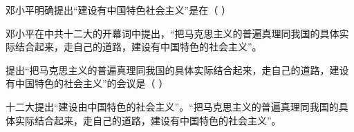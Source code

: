 \question 邓小平明确提出``建设有中国特色社会主义''是在（ ）
\par{}
\begin{solution}邓小平在中共十二大的开幕词中提出，``把马克思主义的普遍真理同我国的具体实际结合起来，走自己的道路，建设有中国特色的社会主义''。
\end{solution}
\question 提出``把马克思主义的普遍真理同我国的具体实际结合起来，走自己的道路，建设有中国特色的社会主义''的会议是（
）
\par{}
\begin{solution}十二大提出``建设由中国特色的社会主义''。``把马克思主义的普遍真理同我国的具体实际结合起来，走自己的道路，建设有中国特色的社会主义''。
\end{solution}
